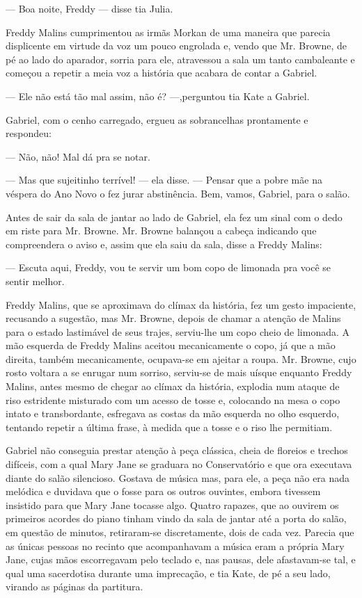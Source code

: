 --- Boa noite, Freddy --- disse tia Julia.

Freddy Malins cumprimentou as irmãs Morkan de uma maneira que
parecia displicente em virtude da voz um pouco engrolada e, vendo
que Mr. Browne, de pé ao lado do aparador, sorria para ele, atravessou
a sala um tanto cambaleante e começou a repetir a meia voz a história
que acabara de contar a Gabriel.

--- Ele não está tão mal assim, não é? ---,perguntou tia Kate a
Gabriel.

Gabriel, com o cenho carregado, ergueu as sobrancelhas prontamente e
respondeu:

--- Não, não! Mal dá pra se notar.

--- Mas que sujeitinho terrível! --- ela disse. --- Pensar que a pobre
mãe na véspera do Ano Novo o fez jurar abstinência. Bem, vamos,
Gabriel, para o salão.

Antes de sair da sala de jantar ao lado de Gabriel, ela fez um sinal
com o dedo em riste para Mr. Browne. Mr. Browne balançou a cabeça
indicando que compreendera o aviso e, assim que ela saiu da sala,
disse a Freddy Malins:

--- Escuta aqui, Freddy, vou te servir um bom copo de limonada pra
você se sentir melhor.

Freddy Malins, que se aproximava do clímax da história, fez um gesto
impaciente, recusando a sugestão, mas Mr. Browne,
depois de chamar a atenção de Malins para o estado lastimável de seus
trajes, serviu-lhe um copo cheio de limonada. A mão esquerda de
Freddy Malins aceitou mecanicamente o copo, já que a mão direita,
também mecanicamente, ocupava-se em ajeitar a roupa. Mr. Browne, cujo
rosto voltara a se enrugar num sorriso, serviu-se de mais uísque
enquanto Freddy Malins, antes mesmo de chegar ao clímax da história,
explodia num ataque de riso estridente misturado com um acesso de
tosse e, colocando na mesa o copo intato e transbordante, esfregava as
costas da mão esquerda no olho esquerdo, tentando repetir a última
frase, à medida que a tosse e o riso lhe permitiam.

\dotfill\hspace{.7\textwidth}

Gabriel não conseguia prestar atenção à peça clássica, cheia de
floreios e trechos difíceis, com a qual Mary Jane se graduara no
Conservatório e que ora executava diante do salão silencioso. Gostava
de música mas, para ele, a peça não era nada melódica e duvidava que o
fosse para os outros ouvintes, embora tivessem insistido para que Mary
Jane tocasse algo. Quatro rapazes, que ao ouvirem os primeiros acordes
do piano tinham vindo da sala de jantar até a porta do salão, em
questão de minutos, retiraram-se discretamente, dois de cada vez.
Parecia que as únicas pessoas no recinto que acompanhavam a música
eram a própria Mary Jane, cujas mãos escorregavam pelo teclado e, nas
pausas, dele afastavam-se tal, e qual uma sacerdotisa durante uma
imprecação, e tia Kate, de pé a seu lado, virando as páginas da
partitura.

